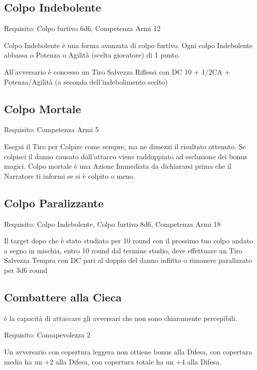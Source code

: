 \documentclass[a4paper,11pt,twoside,openany]{book}
\begin{document}
\subsection{Colpo Indebolente}

Requisito: Colpo furtivo 6d6, Competenza Armi 12

Colpo Indebolente è una forma avanzata di colpo furtivo. Ogni colpo Indebolente abbassa o Potenza o Agilità (scelta giocatore) di 1 punto.

All'avversario è concesso un Tiro Salvezza Riflessi con DC 10 + 1/2CA + Potenza/Agilità (a seconda dell'indebolimento scelto)

\subsection{Colpo Mortale}

Requisito: Competenza Armi 5

Esegui il Tiro per Colpire come sempre, ma ne dimezzi il risultato ottenuto. Se colpisci il danno causato dall'attacco viene raddoppiato ad esclusione dei bonus magici. Colpo mortale è una Azione Immediata da dichiararsi prima che il Narratore ti informi se si è colpito o meno.

\subsection{Colpo Paralizzante}

Requisito: Colpo Indebolente, Colpo furtivo 8d6, Competenza Armi 18

Il target dopo che è stato studiato per 10 round con il prossimo tuo colpo andato a segno in mischia, entro 10 round dal termine studio, deve effettuare un Tiro Salvezza Tempra con DC pari al doppio del danno inflitto o rimanere paralizzato per 3d6 round

\subsection{Combattere alla Cieca}

è la capacità di attaccare gli avversari che non sono chiaramente percepibili.

Requisito: Consapevolezza 2

Un avversario con copertura leggera non ottiene bonus alla Difesa, con copertura media ha un +2 alla Difesa, con copertura totale ha un +4 alla Difesa.
\end{document}
